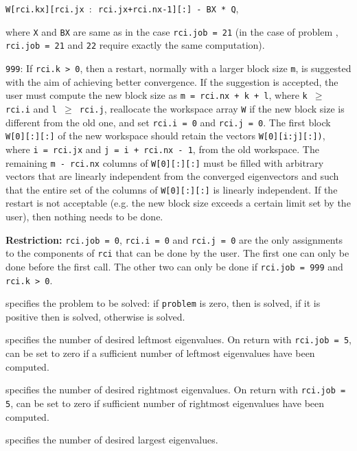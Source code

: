 \begin{description}
\begin{description}
\hspace{12mm}
{\tt W[rci.kx][rci.jx $:$ rci.jx+rci.nx-1][:] - BX * Q},

where {\tt X} and {\tt BX} are same as in 
the case {\tt rci.job = 21}
(in the case of problem ,
{\tt rci.job = 21} and {\tt 22} 
require exactly the same computation).
%
\item
{\tt 999}: 
If {\tt rci.k > 0}, then
a restart, normally with a larger block size {\tt m},
is suggested with the aim of achieving better convergence.
If the suggestion is accepted, the user must compute
the new block size as {\tt m = rci.nx + k + l},
where {\tt k $\ge$ rci.i} and {\tt l $\ge$ rci.j},
reallocate the workspace array {\tt W}
if the new block size is different from the old one,
and set {\tt rci.i = 0} and {\tt rci.j = 0}.
The first block {\tt W[0][:][:]} of the new
workspace should retain the vectors 
{\tt W[0][i:j][:])},
where {\tt i = rci.jx} and {\tt j = i + rci.nx - 1},
from the old workspace.
The remaining {\tt m - rci.nx} columns of {\tt W[0][:][:]}
must be filled
with arbitrary vectors that are linearly independent from 
the converged eigenvectors and such that
the entire set of the columns of {\tt W[0][:][:]}
is linearly independent.
If the restart is not acceptable
(e.g. the new block size exceeds a certain limit set by the user), 
then nothing needs to be done.
%
\end{description}
%
{\bf Restriction:} 
{\tt rci.job = 0}, 
{\tt rci.i = 0} and
{\tt rci.j = 0} 
are the only %
assignments to the components of {\tt rci}
that can be done
by the user.
The first one can only be done before the first call.
The other two can only be done if
{\tt rci.job = 999} and {\tt rci.k > 0}.
%
\item[\texttt{problem}] specifies the problem to be solved:
if {\tt problem} is zero, then  is solved,
if it is positive then  is solved,
otherwise  is solved.
%
\item[\texttt{left}] specifies the number of desired leftmost eigenvalues.
On return with {\tt rci.job = 5}, can be set to zero if a
sufficient number of leftmost eigenvalues have been computed.
%
\item[\texttt{right}] specifies the number of desired rightmost eigenvalues.
On return with {\tt rci.job = 5}, can be set to zero if
sufficient number of rightmost eigenvalues have been computed.
%
\item[\texttt{nep}] specifies the number of desired largest eigenvalues.

\end{description}

